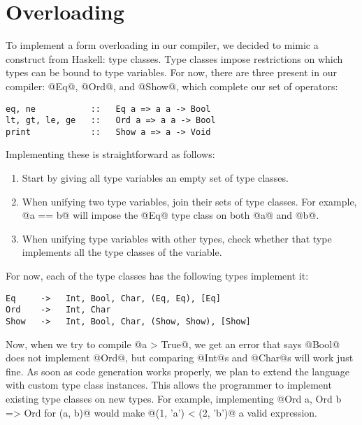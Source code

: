 \section{Overloading}
To implement a form overloading in our compiler, we decided to mimic a construct from Haskell: type classes. Type classes impose restrictions on which types can be bound to type variables. For now, there are three present in our compiler: @Eq@, @Ord@, and @Show@, which complete our set of operators:
\begin{lstlisting}[language=spl]
eq, ne           ::   Eq a => a a -> Bool
lt, gt, le, ge   ::   Ord a => a a -> Bool
print            ::   Show a => a -> Void
\end{lstlisting}
Implementing these is straightforward as follows:
\begin{enumerate}
    \item Start by giving all type variables an empty set of type classes.
    \item When unifying two type variables, join their sets of type classes. For example, @a == b@ will impose the @Eq@ type class on both @a@ and @b@.
    \item When unifying type variables with other types, check whether that type implements all the type classes of the variable.
\end{enumerate}
For now, each of the type classes has the following types implement it:
\begin{lstlisting}[language=spl]
Eq     ->   Int, Bool, Char, (Eq, Eq), [Eq]
Ord    ->   Int, Char
Show   ->   Int, Bool, Char, (Show, Show), [Show]
\end{lstlisting}
Now, when we try to compile @a > True@, we get an error that says @Bool@ does not implement @Ord@, but comparing @Int@s and @Char@s will work just fine. As soon as code generation works properly, we plan to extend the language with custom type class instances. This allows the programmer to implement existing type classes on new types. For example, implementing @Ord a, Ord b => Ord for (a, b)@ would make @(1, 'a') < (2, 'b')@ a valid expression.

